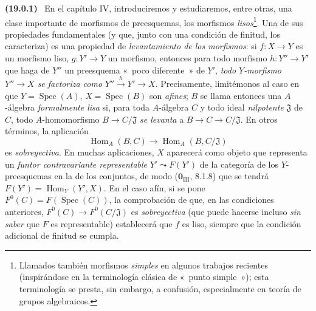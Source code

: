\documentclass[10pt,oneside]{book}
\makeatletter
\newcommand{\setmanualcurrentlabel}[1]{\def\@currentlabel{#1}}
\newenvironment{env}[1][]{\setmanualcurrentlabel{#1}\par\medskip\noindent\textbf{(#1)}\ }{\par}
\makeatother
\begin{document}
\begin{env}[19.0.1]
\label{0.19.0.1-es}
En el capítulo IV, introduciremos y estudiaremos, entre otras, una clase
importante de morfismos de preesquemas, los morfismos \emph{lisos}\footnote{Llamados
también morfismos \emph{simples} en algunos trabajos recientes (inspirándose
en la terminología clásica de «~punto simple~»); esta terminología se presta,
sin embargo, a confusión, especialmente en teoría de grupos algebraicos.}. Una de
sus propiedades fundamentales (y que, junto con una condición de finitud, los
caracteriza) es una propiedad de \emph{levantamiento de los morfismos}: si
$f:X\to Y$ es un morfismo liso, $g:Y'\to Y$ un morfismo, entonces para todo
morfismo $h:Y''\to Y'$ que haga de $Y''$ un preesquema «~poco diferente~» de
$Y'$, \emph{todo $Y$-morfismo $Y''\to X$ se factoriza como}
$Y''\xrightarrow{h}Y'\to X$. Precisamente, limitémonos al caso en que
$Y=\operatorname{Spec}(A)$, $X=\operatorname{Spec}(B)$ son \emph{afines};
$B$ se llama entonces una $A$-álgebra \emph{formalmente lisa} si, para toda
$A$-álgebra $C$ y todo ideal \emph{nilpotente} $\mathfrak J$ de $C$, todo
$A$-homomorfismo $B\to C/\mathfrak J$ \emph{se levanta} a
$B\to C\to C/\mathfrak J$. En otros términos, la aplicación
\[
  \operatorname{Hom}_A(B,C)\longrightarrow
  \operatorname{Hom}_A(B,C/\mathfrak J)
\]
es \emph{sobreyectiva}. En muchas aplicaciones, $X$ aparecerá como objeto
que representa un \emph{funtor contravariante representable} $Y'\leadsto F(Y')$
de la categoría de los $Y$-preesquemas en la de los conjuntos, de modo
($\mathbf{0}_{\mathrm{III}}$, 8.1.8) que se tendrá
$F(Y')=\operatorname{Hom}_Y(Y',X)$. En el caso afín, si se pone
$F^0(C)=F(\operatorname{Spec}(C))$, la comprobación de que, en las
condiciones anteriores, $F^0(C)\to F^0(C/\mathfrak J)$ es \emph{sobreyectiva}
(que puede hacerse incluso \emph{sin saber} que $F$ es representable) establecerá
que $f$ es liso, siempre que la condición adicional de finitud
se cumpla.
\end{env}
\end{document}
